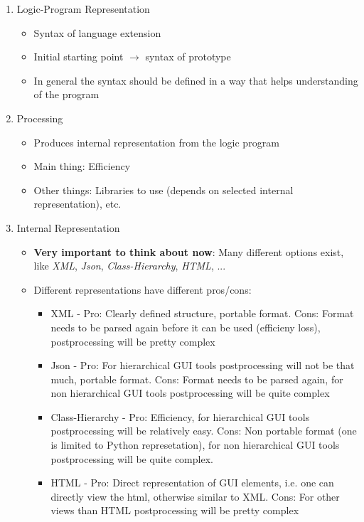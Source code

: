 \documentclass[12pt,a4paper]{article}
\newcommand{\<}[1]{\guilsinglleft}
\renewcommand{\>}[1]{\guilsinglright}
\begin{document}
\begin{enumerate}
    \item Logic-Program Representation
    \begin{itemize}
        \item Syntax of language extension
        \item Initial starting point \(\rightarrow\) syntax of prototype
        \item In general the syntax should be defined in a way that helps understanding of the program
    \end{itemize}
    \item Processing 
    \begin{itemize}
        \item Produces internal representation from the logic program
        \item Main thing: Efficiency
        \item Other things: Libraries to use (depends on selected internal representation), etc.
    \end{itemize}
    \item Internal Representation
    \begin{itemize}
        \item \textbf{Very important to think about now}: Many different options exist, like \textit{XML}, \textit{Json}, \textit{Class-Hierarchy}, \textit{HTML}, ...
        \item Different representations have different pros/cons:
        \begin{itemize}
            \item XML - Pro: Clearly defined structure, portable format. Cons: Format needs to be parsed again before it can be used (efficieny loss), postprocessing will be pretty complex
            \item Json - Pro: For hierarchical GUI tools postprocessing will not be that much, portable format. Cons: Format needs to be parsed again, for non hierarchical GUI tools postprocessing will be quite complex
            \item Class-Hierarchy - Pro: Efficiency, for hierarchical GUI tools postprocessing will be relatively easy. Cons: Non portable format (one is limited to Python represetation), for non hierarchical GUI tools postprocessing will be quite complex.
            \item HTML - Pro: Direct representation of GUI elements, i.e. one can directly view the html, otherwise similar to XML. Cons: For other views than HTML postprocessing will be pretty complex

\end{itemize}
\end{itemize}
\end{enumerate}
\end{document}
